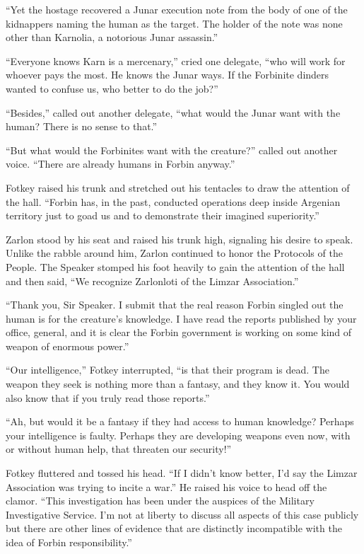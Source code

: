 ``Yet the hostage recovered a Junar execution note from the body of one of the kidnappers naming
the human as the target. The holder of the note was none other than Karnolia, a notorious Junar
assassin.''

``Everyone knows Karn is a mercenary,'' cried one delegate, ``who will work for whoever pays the
most. He knows the Junar ways. If the Forbinite dinders wanted to confuse us, who better to do
the job?''

``Besides,'' called out another delegate, ``what would the Junar want with the human? There is
no sense to that.''

``But what would the Forbinites want with the creature?'' called out another voice. ``There are
already humans in Forbin anyway.''

Fotkey raised his trunk and stretched out his tentacles to draw the attention of the hall.
``Forbin has, in the past, conducted operations deep inside Argenian territory just to goad us
and to demonstrate their imagined superiority.''

Zarlon stood by his seat and raised his trunk high, signaling his desire to speak. Unlike the
rabble around him, Zarlon continued to honor the Protocols of the People. The Speaker stomped
his foot heavily to gain the attention of the hall and then said, ``We recognize Zarlonloti of
the Limzar Association.''

``Thank you, Sir Speaker. I submit that the real reason Forbin singled out the human is for the
creature's knowledge. I have read the reports published by your office, general, and it is clear
the Forbin government is working on some kind of weapon of enormous power.''

``Our intelligence,'' Fotkey interrupted, ``is that their program is dead. The weapon they seek
is nothing more than a fantasy, and they know it. You would also know that if you truly read
those reports.''

``Ah, but would it be a fantasy if they had access to human knowledge? Perhaps your intelligence
is faulty. Perhaps they are developing weapons even now, with or without human help, that
threaten our security!''

Fotkey fluttered and tossed his head. ``If I didn't know better, I'd say the Limzar Association
was trying to incite a war.'' He raised his voice to head off the clamor. ``This investigation
has been under the auspices of the Military Investigative Service. I'm not at liberty to discuss
all aspects of this case publicly but there are other lines of evidence that are distinctly
incompatible with the idea of Forbin responsibility.''

